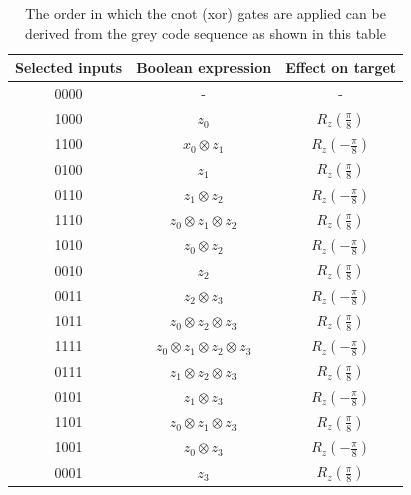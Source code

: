 \documentclass[12pt,a4paper]{article}
\begin{document}
\begin{table}[htbp]
\caption{The order in which the cnot (xor) gates are applied can be derived from the grey code sequence as shown in this table}
\label{table:grey_code_truth}
\begin{center}
\begin{tabular}{|c|c|c|} 
 \hline
 Selected inputs & Boolean expression & Effect on target \\  
 \hline
 0000 & - & - \\ 
 \hline
 1000 & \(z_0\) & \(R_z(\frac{\pi}{8})\) \\
 \hline
 1100 & \(x_0 \otimes z_1\) & \(R_z(-\frac{\pi}{8})\) \\
 \hline
 0100 & \(z_1\) & \(R_z(\frac{\pi}{8})\) \\
 \hline
 0110 & \(z_1 \otimes z_2\) & \(R_z(-\frac{\pi}{8})\) \\
 \hline
 1110 & \(z_0 \otimes z_1 \otimes z_2\) & \(R_z(\frac{\pi}{8})\) \\
 \hline 
 1010 & \(z_0 \otimes z_2\) & \(R_z(-\frac{\pi}{8})\) \\
 \hline 
 0010 & \(z_2\) & \(R_z(\frac{\pi}{8})\) \\
 \hline
 0011 & \(z_2 \otimes z_3\) & \(R_z(-\frac{\pi}{8})\) \\
 \hline
 1011 & \(z_0 \otimes z_2 \otimes z_3\) & \(R_z(\frac{\pi}{8})\) \\
 \hline
 1111 & \(z_0 \otimes z_1 \otimes z_2 \otimes z_3\) & \(R_z(-\frac{\pi}{8})\) \\
 \hline
 0111 & \(z_1 \otimes z_2 \otimes z_3\) & \(R_z(\frac{\pi}{8})\) \\
 \hline
 0101 & \(z_1 \otimes z_3\) & \(R_z(-\frac{\pi}{8})\) \\
 \hline
 1101 & \(z_0 \otimes z_1 \otimes z_3\) & \(R_z(\frac{\pi}{8})\) \\
 \hline 
 1001 & \(z_0 \otimes z_3\) & \(R_z(-\frac{\pi}{8})\) \\
 \hline 
 0001 & \(z_3\) & \(R_z(\frac{\pi}{8})\) \\
 \hline
\end{tabular}
\end{center}
\end{table}
\end{document}
